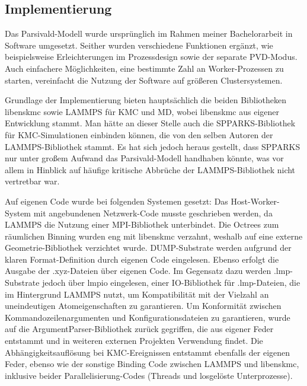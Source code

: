 \subsection{Implementierung}

Das Parsivald-Modell wurde ursprünglich im Rahmen meiner Bachelorarbeit  in Software umgesetzt.
Seither wurden verschiedene Funktionen ergänzt, wie beispielsweise Erleichterungen im Prozessdesign sowie der separate PVD-Modus.
Auch einfachere Möglichkeiten, eine bestimmte Zahl an Worker-Prozessen zu starten, vereinfacht die Nutzung der Software auf größeren Clustersystemen.

Grundlage der Implementierung bieten hauptsächlich die beiden Bibliotheken libenskmc sowie LAMMPS für KMC und MD, wobei libenskmc aus eigener Entwicklung stammt.
Man hätte an dieser Stelle auch die SPPARKS-Bibliothek für KMC-Simulationen einbinden können, die von den selben Autoren der LAMMPS-Bibliothek stammt.
Es hat sich jedoch heraus gestellt, dass SPPARKS nur unter großem Aufwand das Parsivald-Modell handhaben könnte, was vor allem in Hinblick auf häufige kritische Abbrüche der LAMMPS-Bibliothek nicht vertretbar war.

Auf eigenen Code wurde bei folgenden Systemen gesetzt:
Das Host-Worker-System mit angebundenen Netzwerk-Code musste geschrieben werden, da LAMMPS die Nutzung einer MPI-Bibliothek unterbindet.
Die Octrees zum räumlichen Binning wurden eng mit libenskmc verzahnt, weshalb auf eine externe Geometrie-Bibliothek verzichtet wurde.
DUMP-Substrate werden aufgrund der klaren Format-Definition durch eigenen Code eingelesen.
Ebenso erfolgt die Ausgabe der .xyz-Dateien über eigenen Code.
Im Gegensatz dazu werden .lmp-Substrate jedoch über lmpio eingelesen, einer IO-Bibliothek für .lmp-Dateien, die im Hintergrund LAMMPS nutzt, um Kompatibilität mit der Vielzahl an uneindeutigen Atomeigenschaften zu garantieren.
Um Konformität zwischen Kommandozeilenargumenten und Konfigurationsdateien zu garantieren, wurde auf die ArgumentParser-Bibliothek zurück gegriffen, die aus eigener Feder entstammt und in weiteren externen Projekten Verwendung findet.
Die Abhängigkeitsauflösung bei KMC-Ereignissen entstammt ebenfalls der eigenen Feder, ebenso wie der sonstige Binding Code zwischen LAMMPS und libenskmc, inklusive beider Parallelisierung-Codes (Threads und losgelöste Unterprozesse).

